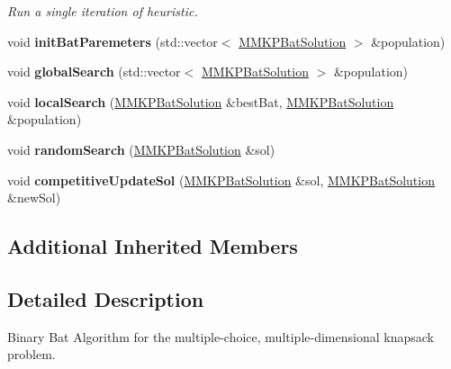 \begin{DoxyCompactItemize}
\begin{DoxyCompactList}\small\item\em Run a single iteration of heuristic. \end{DoxyCompactList}\item 
\hypertarget{class_m_m_k_p___b_b_a_a35ef47fbf5ddc306c56269c86492b513}{void {\bfseries init\+Bat\+Paremeters} (std\+::vector$<$ \hyperlink{struct_m_m_k_p_bat_solution}{M\+M\+K\+P\+Bat\+Solution} $>$ \&population)}\label{class_m_m_k_p___b_b_a_a35ef47fbf5ddc306c56269c86492b513}

\item 
\hypertarget{class_m_m_k_p___b_b_a_a69ed03ff0cfc287e99fdadf22b895837}{void {\bfseries global\+Search} (std\+::vector$<$ \hyperlink{struct_m_m_k_p_bat_solution}{M\+M\+K\+P\+Bat\+Solution} $>$ \&population)}\label{class_m_m_k_p___b_b_a_a69ed03ff0cfc287e99fdadf22b895837}

\item 
\hypertarget{class_m_m_k_p___b_b_a_a034ec79e13826eab9f4a5467bd0dc631}{void {\bfseries local\+Search} (\hyperlink{struct_m_m_k_p_bat_solution}{M\+M\+K\+P\+Bat\+Solution} \&best\+Bat, \hyperlink{struct_m_m_k_p_bat_solution}{M\+M\+K\+P\+Bat\+Solution} \&population)}\label{class_m_m_k_p___b_b_a_a034ec79e13826eab9f4a5467bd0dc631}

\item 
\hypertarget{class_m_m_k_p___b_b_a_a9f9d1b11c77b6ed4f762288ce7d6738f}{void {\bfseries random\+Search} (\hyperlink{struct_m_m_k_p_bat_solution}{M\+M\+K\+P\+Bat\+Solution} \&sol)}\label{class_m_m_k_p___b_b_a_a9f9d1b11c77b6ed4f762288ce7d6738f}

\item 
\hypertarget{class_m_m_k_p___b_b_a_ae9a16bfab53289ed234348b3553c6a53}{void {\bfseries competitive\+Update\+Sol} (\hyperlink{struct_m_m_k_p_bat_solution}{M\+M\+K\+P\+Bat\+Solution} \&sol, \hyperlink{struct_m_m_k_p_bat_solution}{M\+M\+K\+P\+Bat\+Solution} \&new\+Sol)}\label{class_m_m_k_p___b_b_a_ae9a16bfab53289ed234348b3553c6a53}

\end{DoxyCompactItemize}
\subsection*{Additional Inherited Members}


\subsection{Detailed Description}
Binary Bat Algorithm for the multiple-\/choice, multiple-\/dimensional knapsack problem. 

